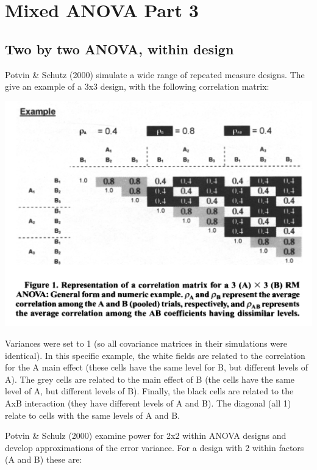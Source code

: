 \documentclass[]{book}
\begin{document}
\hypertarget{mixed-anova-part-3}{%
\chapter{Mixed ANOVA Part 3}\label{mixed-anova-part-3}}

\hypertarget{two-by-two-anova-within-design}{%
\section{Two by two ANOVA, within design}\label{two-by-two-anova-within-design}}

Potvin \& Schutz (2000) simulate a wide range of repeated measure designs. The give an example of a 3x3 design, with the following correlation matrix:

\includegraphics{screenshots/PS2000.png}

Variances were set to 1 (so all covariance matrices in their simulations were identical). In this specific example, the white fields are related to the correlation for the A main effect (these cells have the same level for B, but different levels of A). The grey cells are related to the main effect of B (the cells have the same level of A, but different levels of B). Finally, the black cells are related to the AxB interaction (they have different levels of A and B). The diagonal (all 1) relate to cells with the same levels of A and B.

Potvin \& Schulz (2000) examine power for 2x2 within ANOVA designs and develop approximations of the error variance. For a design with 2 within factors (A and B) these are:
\end{document}
